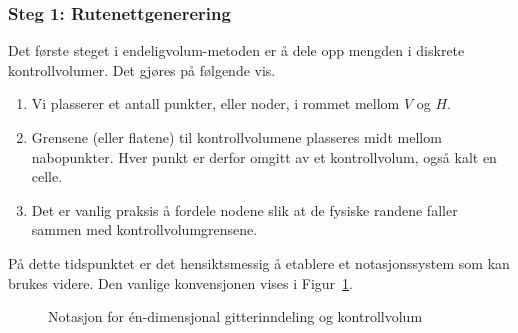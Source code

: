 \subsubsection*{Steg 1: Rutenettgenerering}
Det første steget i endeligvolum-metoden er å dele opp mengden i diskrete kontrollvolumer. Det gjøres på følgende vis.
\begin{enumerate}
\item Vi plasserer et antall punkter, eller noder, i rommet mellom $V$ og $H$. 
\item Grensene (eller flatene) til kontrollvolumene plasseres midt mellom nabopunkter. Hver punkt er derfor omgitt av et kontrollvolum, også kalt en celle.
\item  Det er vanlig praksis å fordele nodene slik at de fysiske randene faller sammen med kontrollvolumgrensene.
\end{enumerate}
På dette tidspunktet er det hensiktsmessig å etablere et notasjonssystem som kan brukes videre. Den vanlige konvensjonen vises i Figur~\ref{fig:grid-notation}.

\begin{figure}[ht]
\centering
{}
\caption{Notasjon for én-dimensjonal gitterinndeling og kontrollvolum}
\label{fig:grid-notation}
\end{figure}

